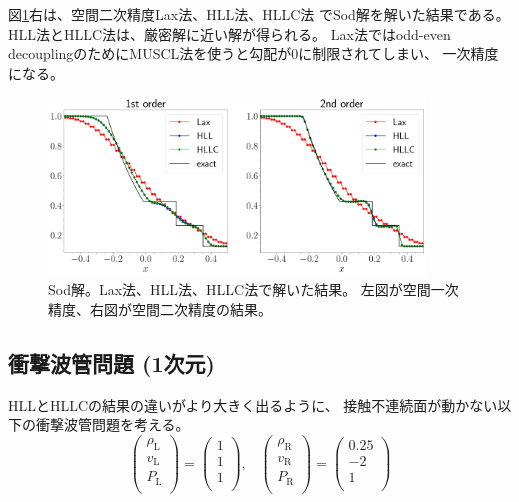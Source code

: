 図\ref{fig:laxhllhllc}右は、空間二次精度Lax法、HLL法、HLLC法
でSod解を解いた結果である。
HLL法とHLLC法は、厳密解に近い解が得られる。
Lax法ではodd-even decouplingのためにMUSCL法を使うと勾配が0に制限されてしまい、
一次精度になる。

\begin{figure}[htpb]
    \centering
    \includegraphics[width=10cm]{figures/sod_lax_hll_hllc.pdf}
    \caption{Sod解。Lax法、HLL法、HLLC法で解いた結果。
    左図が空間一次精度、右図が空間二次精度の結果。
    }
    \label{fig:laxhllhllc}
\end{figure}

\clearpage
\subsection{衝撃波管問題 (1次元)}

HLLとHLLCの結果の違いがより大きく出るように、
接触不連続面が動かない以下の衝撃波管問題を考える。
\begin{equation}
\left(
\begin{array}{c}
\rho_\mathrm{L} \\
v_\mathrm{L} \\
P_\mathrm{L} \\
\end{array}
\right)
= 
\left(
\begin{array}{c}
1 \\
1 \\
1 \\
\end{array}
\right),\;\;\;
\left(
\begin{array}{c}
\rho_\mathrm{R} \\
v_\mathrm{R} \\
P_\mathrm{R} \\
\end{array}
\right)
= 
\left(
\begin{array}{c}
0.25 \\
-2 \\
1 \\
\end{array}
\right)
\label{shini}
\end{equation}

